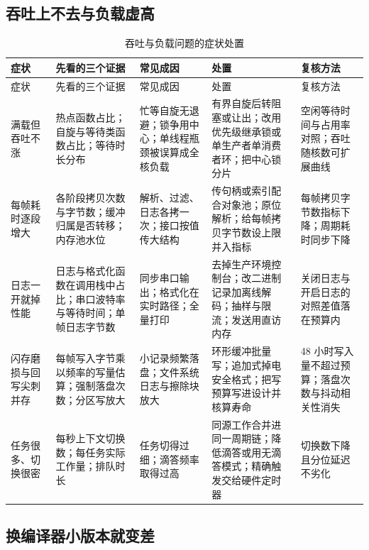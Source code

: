 \documentclass[12pt,a4paper,fontset=fandol]{ctexbook}
\begin{document}
\subsection{吞吐上不去与负载虚高}

\begin{longtable}{>{\raggedright\arraybackslash\footnotesize}p{}>{\raggedright\arraybackslash\footnotesize}p{}>{\raggedright\arraybackslash\footnotesize}p{}>{\raggedright\arraybackslash\footnotesize}p{}>{\raggedright\arraybackslash\footnotesize}p{}}
\caption{吞吐与负载问题的症状处置}\label{tab:apC-throughput} \\
\toprule
症状 & 先看的三个证据 & 常见成因 & 处置 & 复核方法 \\
\midrule
\endfirsthead
\toprule
症状 & 先看的三个证据 & 常见成因 & 处置 & 复核方法 \\
\midrule
\endhead
\bottomrule
\endfoot
\endlastfoot
满载但吞吐不涨 & 热点函数占比；自旋与等待类函数占比；等待时长分布 & 忙等自旋无退避；锁争用中心；单线程瓶颈被误算成全核负载 & 有界自旋后转阻塞或让出；改用优先级继承锁或单生产者单消费者环；把中心锁分片 & 空闲等待时间与占用率对照；吞吐随核数可扩展曲线 \\
每帧耗时逐段增大 & 各阶段拷贝次数与字节数；缓冲归属是否转移；内存池水位 & 解析、过滤、日志各拷一次；接口按值传大结构 & 传句柄或索引配合对象池；原位解析；给每帧拷贝字节数设上限并入指标 & 每帧拷贝字节数指标下降；周期耗时同步下降 \\
日志一开就掉性能 & 日志与格式化函数在调用栈中占比；串口波特率与等待时间；单帧日志字节数 & 同步串口输出；格式化在实时路径；全量打印 & 去掉生产环境控制台；改二进制记录加离线解码；抽样与限流；发送用直访内存 & 关闭日志与开启日志的对照差值落在预算内 \\
闪存磨损与回写尖刺并存 & 每帧写入字节乘以频率的写量估算；强制落盘次数；分区写放大 & 小记录频繁落盘；文件系统日志与擦除块放大 & 环形缓冲批量写；追加式掉电安全格式；把写预算写进设计并核算寿命 & 48 小时写入量不超过预算；落盘次数与抖动相关性消失 \\
任务很多、切换很密 & 每秒上下文切换数；每任务实际工作量；排队时长 & 任务切得过细；滴答频率取得过高 & 同源工作合并进同一周期链；降低滴答或用无滴答模式；精确触发交给硬件定时器 & 切换数下降且分位延迟不劣化 \\
\end{longtable}

\subsection{换编译器小版本就变差}
\end{document}
